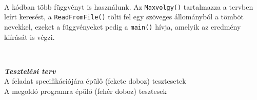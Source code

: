 \documentclass[12pt,a4paper]{article}			%
\newcommand{\fejezet}[1]{\noindent \textbf{\textit{\large #1 \vspace{5mm}}}}
\begin{document}
		 \vspace{2mm}\\
		A kódban több függvényt is használunk. Az \texttt{Maxvolgy()} tartalmazza a tervben leírt keresést, a \texttt{ReadFromFile()} tölti fel egy szöveges állományból a tömböt nevekkel, ezeket a függvényeket pedig a \texttt{main()} hívja, amelyik az eredmény kiírását is végzi.
		\begin{center}
		\vspace{2mm}\\
		\end{center}

	\fejezet{Tesztelési terv}\\
		{\large A feladat specifikációjára épülő (fekete doboz) tesztesetek} \vspace{2mm}\\
		{\large A megoldó programra épülő (fehér doboz) tesztesek} \vspace{2mm}
\end{document}
